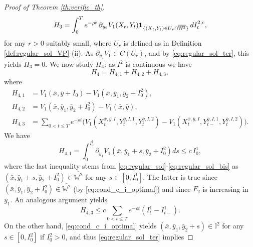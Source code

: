 \documentclass[10pt]{article}
\numberwithin{equation}{section}
\theoremstyle{plain}
\numberwithin{theorem}{section}
\theoremstyle{definition}
\newcommand{\<}{\langle}
\renewcommand{\>}{\rangle}
\renewcommand{\(}{\left(}
\renewcommand{\)}{\right)}
\newcommand\Pb{\mathbb{P}}
\newcommand\Wb{\mathbb{W}}
\newcommand\Ib{\mathbb{I}}
\begin{document}
{{{\begin{proof}[Proof of Theorem \ref{th:verific_th}]
\begin{equation}%
H_3= \int_{0}^{ T } e^{-\rho  t}\, \partial_{y_2} V_1 (X_t , Y_t ) {\bf 1}_{\{ (X_t , Y_t ) \in U_r \cap \overline{\Wb^2}  \}}  \, d I^{2,c}_t, %
\end{equation}
{for any $r>0$ suitably small, where $U_r$ is defined as in Definition \ref{def:regular_sol_VP}-(ii). As $\partial_{y_2} V_1\in C(U_r)$, and by \eqref{eq:regular_sol_ter}, this yields $H_3=0$.} 
We now study $H_4$: as $I^2$ is continuous we have 
\begin{equation}%
H_4 = H_{4,1} + H_{4,2} + H_{4,3} ,
\end{equation}
where
\begin{align} 
H_{4,1} & = V_1 (\bar{x} , \bar{y} + I_0 ) - V_1 (\bar{x} , \bar{y}_{1} , \bar{y}_{2} + I^2_0 ),\\
H_{4,2} & = V_1 (\bar{x} , \bar{y}_1 , \bar{y}_2 + I^2_0 )   - V_1 (\bar{x} , \bar{y}), \\
H_{4,3} & = \sum_{0 < t \leq  T } e^{-\rho t} \big( V_1 (X^{\bar{x},\bar{y},I}_t , Y^{\bar{y},I,1}_t, Y^{\bar{y},I,2}_t ) - V_1 (X^{\bar{x},\bar{y},I}_t , Y^{\bar{y},I,1}_{t-} , Y^{\bar{y},I,2}_{t} )  \big)  .
\end{align}
We have
\begin{equation}\label{eq:ineq_prof_verif_2}
{H}_{4,1} = \int_{0}^{I^1_0} \partial_{y_1} V_1 (\bar{x} , \bar{y}_{1} + s , \bar{y}_{2} + I^2_0 ) ds \leq c\, I^1_0, %
\end{equation}
where the last inequality stems from \eqref{eq:regular_sol}-\eqref{eq:regular_sol_bis} as $(\bar{x} , \bar{y}_{1} + s , \bar{y}_{2} + I^2_0) \in \overline{\Wb^2}$ for any $s\in [0,I^1_0]$. The latter is true since $(\bar{x} , \bar{y}_{1}  , \bar{y}_{2} + I^2_0 ) \in \overline{\Wb^2}$ (by \eqref{eq:cond_c_i_optimal}) and since $F_2$ is increasing in $y_1$. An analogous argument yields
\begin{equation}\label{eq:sum_jumps}
{H}_{4,3} \leq c \sum_{0 < t \leq  T } e^{-\rho t}( I^1_t - I^1_{t-} ).%
\end{equation}
On the other hand, \eqref{eq:cond_c_i_optimal} yields $(\bar{x} , \bar{y}_{1}  , \bar{y}_{2} + s) \in {\Ib^2}$ for any $s\in [0,I^2_0]$ if $I^2_0>0$, and thus \eqref{eq:regular_sol_ter} implies

\end{proof}}}}
\end{document}
